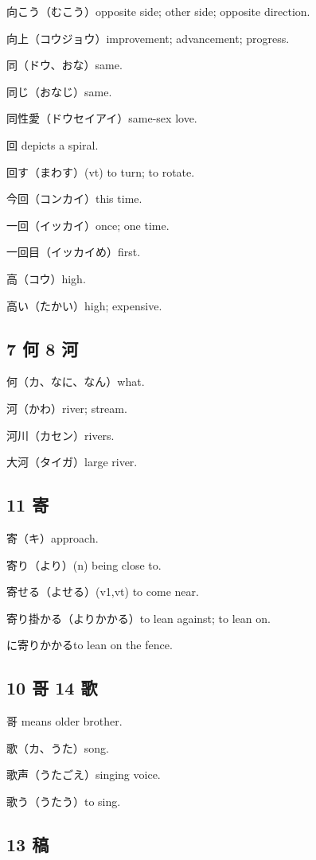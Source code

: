 向こう（むこう）opposite side; other side; opposite direction.

向上（コウジョウ）improvement; advancement; progress.

同（ドウ、おな）same.

同じ（おなじ）same.

同性愛（ドウセイアイ）same-sex love.

回 depicts a spiral.

回す（まわす）(vt) to turn; to rotate.

今回（コンカイ）this time.

一回（イッカイ）once; one time.

一回目（イッカイめ）first.

高（コウ）high.

高い（たかい）high; expensive.

\subsection{7 何 8 河}

何（カ、なに、なん）what.

河（かわ）river; stream.

河川（カセン）rivers.

大河（タイガ）large river.

\subsection{11 寄}

寄（キ）approach.

寄り（より）(n) being close to.

寄せる（よせる）(v1,vt) to come near.

寄り掛かる（よりかかる）to lean against; to lean on.

に寄りかかるto lean on the fence.

\subsection{10 哥 14 歌}

哥 means older brother.

歌（カ、うた）song.

歌声（うたごえ）singing voice.

歌う（うたう）to sing.

\subsection{13 稿}

